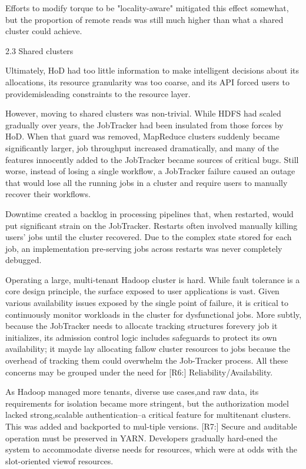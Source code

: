 Efforts to modify torque to be "locality-aware" mitigated this effect
somewhat, but the proportion of remote reads was still much higher than what a
shared cluster could achieve.

2.3 Shared clusters

Ultimately, HoD had too little information to make intelligent decisions about
its allocations, its resource granularity was too coarse, and its API forced
users to providemisleading constraints to the resource layer.

However, moving to shared clusters was non-trivial.
While HDFS had scaled gradually over years, the JobTracker had been insulated
from those forces by HoD.
When that guard was removed, MapReduce clusters suddenly became significantly
larger, job throughput increased dramatically, and many of the features
innocently added to the JobTracker became sources of critical bugs.
Still worse, instead of losing a single workflow, a JobTracker failure caused an
outage that would lose all the running jobs in a cluster and require users to
manually recover their workflows.

Downtime created a backlog in processing pipelines that, when restarted, would
put significant strain on the JobTracker.
Restarts often involved manually killing users' jobs until the cluster
recovered.
Due to the complex state stored for each job, an implementation pre-serving
jobs across restarts was never completely debugged.

Operating a large, multi-tenant Hadoop cluster is hard. While fault tolerance is
a core design principle, the surface exposed to user applications is vast.
Given various availability issues exposed by the single point of failure, it is
critical to continuously monitor workloads in the cluster for dysfunctional
jobs. 
More subtly, because the JobTracker needs to allocate tracking structures
forevery job it initializes, its admission control logic includes safeguards to
protect its own availability; it mayde lay allocating fallow cluster resources
to jobs because the overhead of tracking them could overwhelm the Job-Tracker
process. 
All these concerns may be grouped under the need for [R6:]
Reliability/Availability.

As Hadoop managed more tenants, diverse use cases,and raw data, its
requirements for isolation became more stringent, but the authorization model
lacked strong,scalable authentication--a critical feature for multitenant
clusters. 
This was added and backported to mul-tiple versions. 
[R7:] Secure and auditable operation must be preserved in YARN. 
Developers gradually hard-ened the system to accommodate diverse needs for
resources, which were at odds with the slot-oriented viewof resources.

